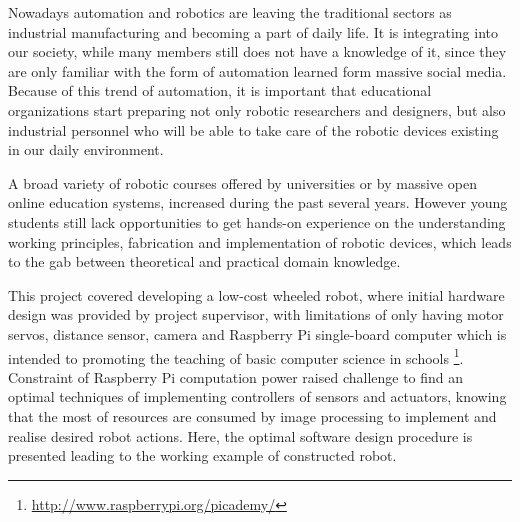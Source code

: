 Nowadays automation and robotics are leaving the traditional sectors as industrial manufacturing and becoming a part of daily life. It is integrating into our society, while many members still does not have a knowledge of it, since they are only familiar with the form of automation learned form massive social media.
Because of this trend of automation, it is important that educational organizations start preparing not only robotic researchers and designers, but also industrial personnel who will be able
to take care of the robotic devices existing in our daily environment. 

A broad variety of robotic courses offered by universities or by massive open online education systems, increased during the past several years. However young students still lack opportunities to get hands-on experience on the understanding working principles, fabrication and implementation of robotic devices, which leads to the gab between theoretical and practical domain knowledge.

This project covered developing a low-cost wheeled robot, where initial hardware design was provided by project supervisor, with limitations of only having motor servos, distance sensor, camera and Raspberry Pi single-board computer which is intended to promoting the teaching of basic computer science in schools \footnote{\url{http://www.raspberrypi.org/picademy/}}.
Constraint of  Raspberry Pi computation power raised challenge to find an  optimal techniques of implementing controllers of sensors and actuators, knowing that the most of resources are consumed by image processing to implement and realise desired robot actions. Here, the optimal software design procedure is presented leading to the working example of constructed robot.
